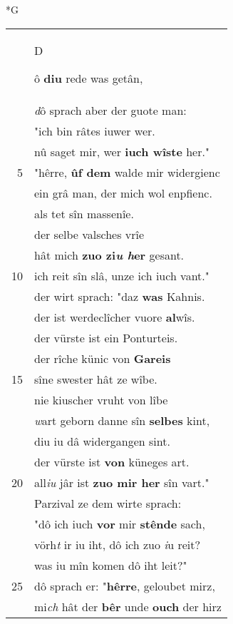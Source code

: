 \documentclass[8pt,a4paper,notitlepage]{article}
\begin{document}
\begin{table}[ht]
\begin{minipage}[t]{0.5\linewidth}
\small
\begin{center}*G
\end{center}
\begin{tabular}{rl}
 & \begin{large}D\end{large}ô \textbf{diu} rede was getân,\\ 
 & \textit{d}ô sprach aber der guote man:\\ 
 & "ich bin râtes iuwer wer.\\ 
 & nû saget mir, wer \textbf{iuch wîste} her."\\ 
5 & "hêrre, \textbf{ûf dem} walde mir widergienc\\ 
 & ein grâ man, der mich wol enpfienc.\\ 
 & als tet sîn massenîe.\\ 
 & der selbe valsches vrîe\\ 
 & hât mich \textbf{zuo zi\textit{u h}er} gesant.\\ 
10 & ich reit sîn slâ, unze ich iuch vant."\\ 
 & der wirt sprach: "daz \textbf{was} Kahnis.\\ 
 & der ist werdeclîcher vuore \textbf{al}wîs.\\ 
 & der vürste ist ein Ponturteis.\\ 
 & der rîche künic von \textbf{Gareis}\\ 
15 & sîne swester hât ze wîbe.\\ 
 & nie kiuscher vruht von lîbe\\ 
 & \textit{w}art geborn danne sîn \textbf{selbes} kint,\\ 
 & diu iu dâ widergangen sint.\\ 
 & der vürste ist \textbf{von} küneges art.\\ 
20 & all\textit{iu} jâr ist \textbf{zuo mir her} sîn vart."\\ 
 & Parzival ze dem wirte sprach: \\ 
 & "dô ich iuch \textbf{vor} mir \textbf{stênde} sach,\\ 
 & vörh\textit{t} ir iu iht, dô ich zuo \textit{i}u reit?\\ 
 & was iu mîn komen dô iht leit?"\\ 
25 & dô sprach er: "\textbf{hêrre}, geloubet mirz,\\ 
 & mi\textit{ch} hât der \textbf{bêr} unde \textbf{ouch} der hirz\\ 

\end{tabular}
\end{minipage}
\end{table}
\end{document}
